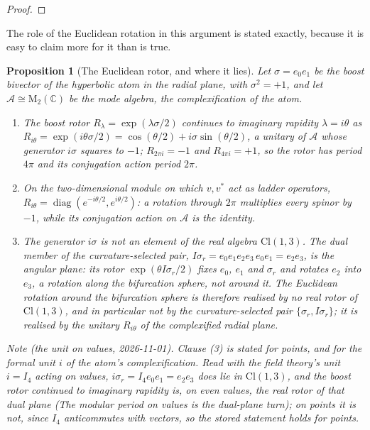 \documentclass[11pt]{article}
\newtheorem{proposition}[theorem]{Proposition}
\theoremstyle{definition}
\theoremstyle{plain}
\newcommand{\changedmark}[2]{\marginpar{\raggedright\scriptsize\color{#1}#2}}
\providecommand{\Aa}{}\renewcommand{\Aa}{\mathcal{A}}
\providecommand{\C}{}\renewcommand{\C}{\mathbb{C}}
\providecommand{\Cl}{}\renewcommand{\Cl}{\mathrm{Cl}}
\providecommand{\Mat}{}\renewcommand{\Mat}{\mathrm{M}}
\begin{document}
\begin{proof}
\end{proof}

\label{c:note.singularity.setting-fixing-rate-where-premise-has-4}
The role of the Euclidean rotation in this argument is stated exactly, because it is easy to claim more for it than is true.

\begin{proposition}[The Euclidean rotor, and where it lies]\label{c:singularity.euclidean-rotor-where-it-lies}
\changedmark{BurntOrange}{changed since the deposit}
Let $\sigma = e_0e_1$ be the boost bivector of the hyperbolic atom in the radial plane, with $\sigma^{2} = +1$, and let $\Aa \cong \Mat_2(\C)$ be the mode algebra, the complexification of the atom.
\begin{enumerate}
\item The boost rotor $R_\lambda = \exp(\lambda\sigma/2)$ continues to imaginary rapidity $\lambda = i\theta$ as $R_{i\theta} = \exp(i\theta\sigma/2) = \cos(\theta/2) + i\sigma\sin(\theta/2)$, a unitary of $\Aa$ whose generator $i\sigma$ squares to $-1$; $R_{2\pi i} = -1$ and $R_{4\pi i} = +1$, so the rotor has period $4\pi$ and its conjugation action period $2\pi$.
\item On the two-dimensional module on which $v, v^{*}$ act as ladder operators, $R_{i\theta} = \operatorname{diag}(e^{-i\theta/2}, e^{i\theta/2})$: a rotation through $2\pi$ multiplies every spinor by $-1$, while its conjugation action on $\Aa$ is the identity.
\item The generator $i\sigma$ is not an element of the real algebra $\Cl(1,3)$. The dual member of the curvature-selected pair, $I\sigma_r = e_0e_1e_2e_3\,e_0e_1 = e_2e_3$, is the \emph{angular} plane: its rotor $\exp(\theta I\sigma_r/2)$ fixes $e_0$, $e_1$ and $\sigma_r$ and rotates $e_2$ into $e_3$, a rotation along the bifurcation sphere, not around it. The Euclidean rotation around the bifurcation sphere is therefore realised by no real rotor of $\Cl(1,3)$, and in particular not by the curvature-selected pair $\{\sigma_r, I\sigma_r\}$; it is realised by the unitary $R_{i\theta}$ of the complexified radial plane.
\end{enumerate}

\emph{Note (the unit on values, 2026-11-01).} Clause (3) is stated for points, and for the formal unit $i$ of the atom's complexification. Read with the field theory's unit $i = I_{4}$ acting on values, $i\sigma_{r} = I_{4}e_{0}e_{1} = e_{2}e_{3}$ does lie in $\Cl(1,3)$, and the boost rotor continued to imaginary rapidity is, on even values, the real rotor of that dual plane (\emph{The modular period on values is the dual-plane turn}); on points it is not, since $I_{4}$ anticommutes with vectors, so the stored statement holds for points.
\end{proposition}
\end{document}
